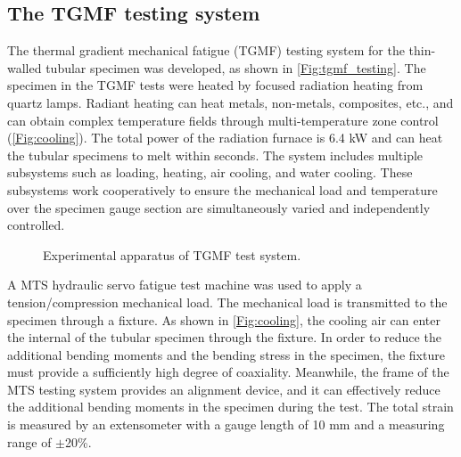 \documentclass[preprint,5p,twocolumn,10pt,sort&compress]{elsarticle}
\begin{document}
\subsection{The TGMF testing system}
The thermal gradient mechanical fatigue (TGMF) testing system for the thin-walled tubular specimen was developed, as shown in \autoref{Fig:tgmf_testing}. The specimen in the TGMF tests were heated by focused radiation heating from quartz lamps. Radiant heating can heat metals, non-metals, composites, etc., and can obtain complex temperature fields through multi-temperature zone control (\autoref{Fig:cooling}). The total power of the radiation furnace is 6.4 kW and can heat the tubular specimens to melt within seconds.
The system includes multiple subsystems such as loading, heating, air cooling, and water cooling. These subsystems work cooperatively to ensure the mechanical load and temperature over the specimen gauge section are simultaneously varied and independently controlled. 
\begin{figure}[!ht]
\caption{Experimental apparatus of TGMF test system.}
\label{Fig:tgmf_testing}
\end{figure}

A MTS hydraulic servo fatigue test machine was used to apply a tension/compression mechanical load. The mechanical load is transmitted to the specimen through a fixture. As shown in \autoref{Fig:cooling}, the cooling air can enter the internal of the tubular specimen through the fixture. In order to reduce the additional bending moments and the bending stress in the specimen, the fixture must provide a sufficiently high degree of coaxiality. Meanwhile, the frame of the MTS testing system provides an alignment device, and it can effectively reduce the additional bending moments in the specimen during the test. The total strain is measured by an extensometer with a gauge length of 10 mm and a measuring range of $\pm$20\%. 
\end{document}
